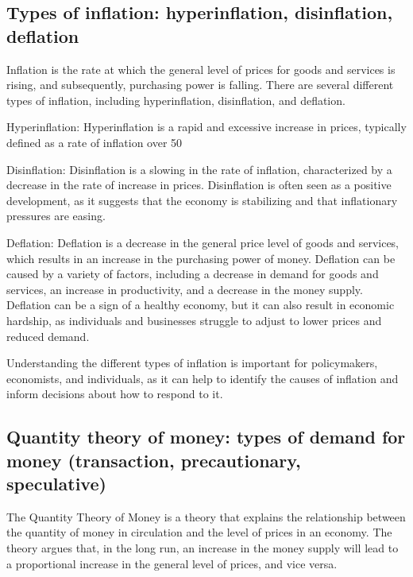 \documentclass[12pt, a4paper, oneside]{article}
\begin{document}
\subsection{ Types of inflation: hyperinflation, disinflation, deflation }
Inflation is the rate at which the general level of prices for goods and services is rising, and subsequently, purchasing power is falling. There are several different types of inflation, including hyperinflation, disinflation, and deflation.

Hyperinflation: Hyperinflation is a rapid and excessive increase in prices, typically defined as a rate of inflation over 50%

Disinflation: Disinflation is a slowing in the rate of inflation, characterized by a decrease in the rate of increase in prices. Disinflation is often seen as a positive development, as it suggests that the economy is stabilizing and that inflationary pressures are easing.

Deflation: Deflation is a decrease in the general price level of goods and services, which results in an increase in the purchasing power of money. Deflation can be caused by a variety of factors, including a decrease in demand for goods and services, an increase in productivity, and a decrease in the money supply. Deflation can be a sign of a healthy economy, but it can also result in economic hardship, as individuals and businesses struggle to adjust to lower prices and reduced demand.

Understanding the different types of inflation is important for policymakers, economists, and individuals, as it can help to identify the causes of inflation and inform decisions about how to respond to it.
\subsection{ Quantity theory of money: types of demand for money (transaction, precautionary, speculative) }
The Quantity Theory of Money is a theory that explains the relationship between the quantity of money in circulation and the level of prices in an economy. The theory argues that, in the long run, an increase in the money supply will lead to a proportional increase in the general level of prices, and vice versa.
\end{document}
